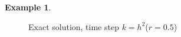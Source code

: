 \documentclass[a4paper,twoside]{ctexart}
\theoremstyle{definition}
\newtheorem{example}[definition]{Example}
\begin{document}
\begin{example}
\begin{figure}[H]
{		}
		\caption*{Exact solution, time step $k = h^2$($r = 0.5$)}
	\end{figure}
\end{example}
	
	
\end{document}
